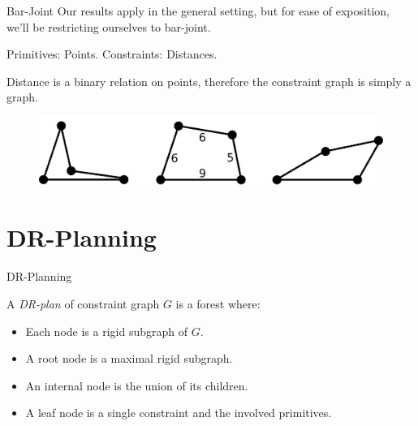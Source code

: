 \documentclass{mySlides}
\newcommand{\todo}[1]{\alert{#1}}
\begin{document}
\begin{frame}{Bar-Joint}
    Our results apply in the general setting, but for ease of exposition, we'll be restricting ourselves to bar-joint.

    \begin{definition}
        Primitives: Points.
        Constraints: Distances.
    \end{definition}

    Distance is a binary relation on points, therefore the constraint graph is simply a graph.

    \begin{figure}
        \includegraphics[width=\linewidth]{../../img/svg/barjoint_illustration_simple}
    \end{figure}
\end{frame}


\section{DR-Planning}
\begin{frame}{DR-Planning}
    \begin{definition}
        A \emph{DR-plan} of constraint graph $G$ is a forest where:
        \begin{itemize}
            \item Each node is a rigid subgraph of $G$.
            \item A root node is a maximal rigid subgraph.
            \item An internal node is the union of its children.
            \item A leaf node is a single constraint and the involved primitives.
        \end{itemize}
    \end{definition}

\end{frame}
\end{document}
